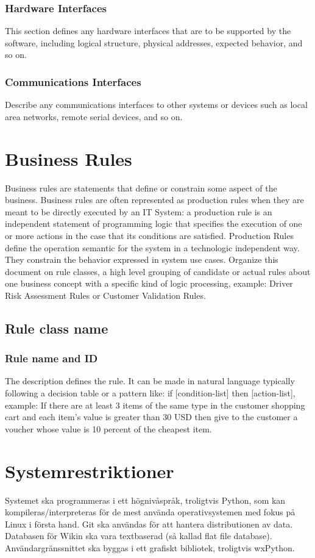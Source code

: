\subsubsection{Hardware Interfaces}
This section defines any hardware interfaces that are to be supported by the software, including logical structure, physical addresses, expected behavior, and so on.

\subsubsection{Communications Interfaces}
Describe any communications interfaces to other systems or devices such as local area networks, remote serial devices, and so on.

\section{Business Rules}
Business rules are statements that define or constrain some aspect of the business. Business rules are often represented as production rules when they are meant to be directly executed by an IT System: a production rule is an independent statement of programming logic that specifies the execution of one or more actions in the case that its conditions are satisfied. Production Rules define the operation semantic for the system in a technologic independent way. They constrain the behavior expressed in system use cases.
Organize this document on rule classes, a high level grouping of candidate or actual rules about one business concept with a specific kind of logic processing, example: Driver Risk Assessment Rules or Customer Validation Rules.

\subsection{Rule class name}

\subsubsection{Rule name and ID}
The description defines the rule. It can be made in natural language typically following a decision table or a pattern like:  if [condition-list] then [action-list], example: 
If there are at least 3 items of the same type in the customer shopping cart and each item’s value is greater than 30 USD then give to the customer a voucher whose value is 10 percent of the cheapest item.

\section{Systemrestriktioner}
Systemet ska programmeras i ett högnivåspråk, troligtvis Python, som kan kompileras/interpreteras för de mest använda operativsystemen med fokus på Linux i första hand. Git ska användas för att hantera distributionen av data. Databasen för Wikin ska vara textbaserad (så kallad flat file database). Användargränssnittet ska byggas i ett grafiskt bibliotek, troligtvis wxPython.

